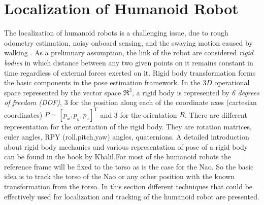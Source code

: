 \section{Localization of Humanoid Robot} %
The localization of humanoid robots is a challenging issue, due to rough odometry estimation, noisy onboard sensing, and the swaying motion caused by walking \cite{cervera2012localization}. As a prelimnary assumption, the link of the robot are considered \emph{rigid bodies} in which distance between any two given points on it remains constant in time regardless of external forces exerted on it. Rigid body transformation forms the basic components in the pose estimation framework. In the $3D$ operational space represented by the vector space $\Re^3$, a rigid body is represented by \emph{6 degrees of freedom (DOF)}, 3 for the position along each of the coordinate axes (cartesian coordinates) $P = [p_x,p_y,p_z]^{\text{T}}$ and 3 for the orientation $R$. There are different representation for the orientation of the rigid body. They are rotation matrices, euler angles, RPY (roll,pitch,yaw) angles, quaternions. A detailed introduction about rigid body mechanics and various representation of pose of a rigid body can be found in the book by Khalil\cite{khalil2004modeling}.For most of the humanoid robots the reference frame will be fixed to the torso as is the case for the Nao. So the basic idea is to track the torso of the Nao or any other position with the known transformation from the torso. In this section different techniques that could be effectively used for localization and tracking of the humanoid robot are presented.


